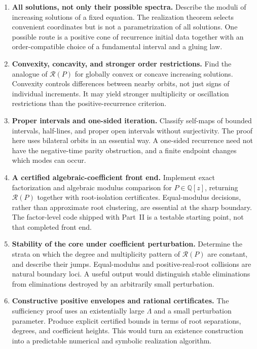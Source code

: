 \documentclass[11pt,letterpaper]{article}
\theoremstyle{definition}
\theoremstyle{remark}
\newcommand{\core}{\mathcal R}
\begin{document}
\begin{enumerate}[label=\textbf{Q\arabic*.},leftmargin=3.2em,itemsep=0.8em]
\item \textbf{All solutions, not only their possible spectra.}
Describe the moduli of increasing solutions of a fixed equation.
The realization theorem selects convenient coordinates but is not a
parametrization of all solutions. One possible route is a positive cone
of recurrence initial data together with an order-compatible choice of
a fundamental interval and a gluing law.

\item \textbf{Convexity, concavity, and stronger order restrictions.}
Find the analogue of $\core(P)$ for globally convex or concave increasing
solutions. Convexity controls differences between nearby orbits, not just
signs of individual increments. It may yield stronger multiplicity or
oscillation restrictions than the positive-recurrence criterion.

\item \textbf{Proper intervals and one-sided iteration.}
Classify self-maps of bounded intervals, half-lines, and proper open
intervals without surjectivity. The proof here uses bilateral orbits in
an essential way. A one-sided recurrence need not have the negative-time
parity obstruction, and a finite endpoint changes which modes can occur.

\item \textbf{A certified algebraic-coefficient front end.}
Implement exact factorization and algebraic modulus comparison for
$P\in\mathbb{Q}[z]$, returning $\core(P)$ together with root-isolation
certificates. Equal-modulus decisions, rather than approximate root
clustering, are essential at the sharp boundary. The factor-level code
shipped with Part~II is a testable starting point, not that completed front
end.

\item \textbf{Stability of the core under coefficient perturbation.}
Determine the strata on which the degree and multiplicity pattern of
$\core(P)$ are constant, and describe their jumps. Equal-modulus and
positive-real-root collisions are natural boundary loci. A useful output
would distinguish stable eliminations from eliminations destroyed by an
arbitrarily small perturbation.

\item \textbf{Constructive positive envelopes and rational certificates.}
The sufficiency proof uses an existentially large $\Lambda$ and a small
perturbation parameter. Produce explicit certified bounds in terms of
root separations, degrees, and coefficient heights. This would turn an
existence construction into a predictable numerical and symbolic
realization algorithm.


\end{enumerate}
\end{document}
